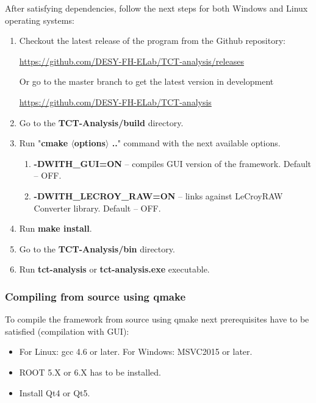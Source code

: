 \documentclass[12pt,oneside,notitlepage,abstracton,a4paper]{scrartcl}
\begin{document}
After satisfying dependencies, follow the next steps for both Windows and Linux operating systems:
\begin{enumerate}
\item Checkout the latest release of the program from the Github repository:
\begin{displayquote}
\url{https://github.com/DESY-FH-ELab/TCT-analysis/releases}
\end{displayquote}
Or go to the master branch to get the latest version in development
\begin{displayquote}
\url{https://github.com/DESY-FH-ELab/TCT-analysis}
\end{displayquote}
\item Go to the \textbf{TCT-Analysis/build} directory.
\item Run "\textbf{cmake $\langle$options$\rangle$ ..}" command with the next available options.
\begin{enumerate}
\item \textbf{-DWITH\_GUI=ON} -- compiles GUI version of the framework. Default -- OFF.
\item \textbf{-DWITH\_LECROY\_RAW=ON} -- links against LeCroyRAW Converter library. Default -- OFF.
\end{enumerate}
\item Run \textbf{make install}.
\item Go to the \textbf{TCT-Analysis/bin} directory.
\item Run \textbf{tct-analysis} or \textbf{tct-analysis.exe} executable.
\end{enumerate}

\subsubsection{Compiling from source using qmake}

To compile the framework from source using qmake next prerequisites have to be satisfied (compilation with GUI):
\begin{itemize}
\item For Linux: gcc 4.6 or later. For Windows: MSVC2015 or later.
\item ROOT 5.X or 6.X has to be installed.
\item Install Qt4 or Qt5.
\end{itemize}
\end{document}
